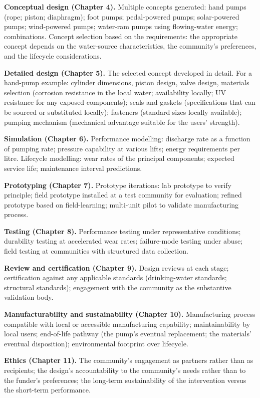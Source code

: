 \textbf{Conceptual design (Chapter 4).} Multiple concepts generated: hand pumps (rope; piston; diaphragm); foot pumps; pedal-powered pumps; solar-powered pumps; wind-powered pumps; water-ram pumps using flowing-water energy; combinations. Concept selection based on the requirements: the appropriate concept depends on the water-source characteristics, the community's preferences, and the lifecycle considerations.

\textbf{Detailed design (Chapter 5).} The selected concept developed in detail. For a hand-pump example: cylinder dimensions, piston design, valve design, materials selection (corrosion resistance in the local water; availability locally; UV resistance for any exposed components); seals and gaskets (specifications that can be sourced or substituted locally); fasteners (standard sizes locally available); pumping mechanism (mechanical advantage suitable for the users' strength).

\textbf{Simulation (Chapter 6).} Performance modelling: discharge rate as a function of pumping rate; pressure capability at various lifts; energy requirements per litre. Lifecycle modelling: wear rates of the principal components; expected service life; maintenance interval predictions.

\textbf{Prototyping (Chapter 7).} Prototype iterations: lab prototype to verify principle; field prototype installed at a test community for evaluation; refined prototype based on field-learning; multi-unit pilot to validate manufacturing process.

\textbf{Testing (Chapter 8).} Performance testing under representative conditions; durability testing at accelerated wear rates; failure-mode testing under abuse; field testing at communities with structured data collection.

\textbf{Review and certification (Chapter 9).} Design reviews at each stage; certification against any applicable standards (drinking-water standards; structural standards); engagement with the community as the substantive validation body.

\textbf{Manufacturability and sustainability (Chapter 10).} Manufacturing process compatible with local or accessible manufacturing capability; maintainability by local users; end-of-life pathway (the pump's eventual replacement; the materials' eventual disposition); environmental footprint over lifecycle.

\textbf{Ethics (Chapter 11).} The community's engagement as partners rather than as recipients; the design's accountability to the community's needs rather than to the funder's preferences; the long-term sustainability of the intervention versus the short-term performance.

